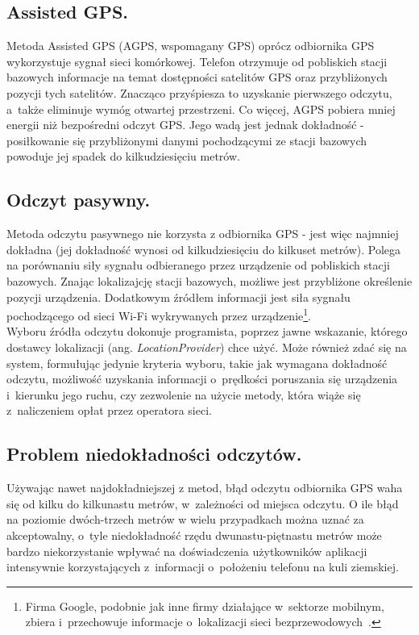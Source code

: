 \documentclass[a4paper,twocolumn,11pt]{article}
\begin{document}
\subsection{Assisted GPS.}
 Metoda Assisted GPS (AGPS, wspomagany GPS) oprócz odbiornika GPS wykorzystuje sygnał sieci komórkowej.
 Telefon otrzymuje od pobliskich stacji bazowych informacje na temat dostępności satelitów GPS oraz przybliżonych pozycji tych satelitów.
 Znacząco przyśpiesza to uzyskanie pierwszego odczytu, a~także eliminuje wymóg otwartej przestrzeni.
 Co więcej, AGPS pobiera mniej energii niż bezpośredni odczyt GPS.
 Jego wadą jest jednak dokładność - posiłkowanie się przybliżonymi danymi pochodzącymi ze stacji bazowych powoduje jej spadek do kilkudziesięciu metrów.


\subsection{Odczyt pasywny.}
 Metoda odczytu pasywnego nie korzysta z odbiornika GPS - jest więc najmniej dokładna (jej dokładność wynosi od kilkudziesięciu do kilkuset metrów).
 Polega na porównaniu siły sygnału odbieranego przez urządzenie od pobliskich stacji bazowych.
 Znając lokalizajcję stacji bazowych, możliwe jest przybliżone określenie pozycji urządzenia.
 Dodatkowym źródłem informacji jest siła sygnału pochodzącego od sieci Wi-Fi wykrywanych przez urządzenie\footnote{Firma Google, podobnie jak inne firmy działające w~sektorze mobilnym, zbiera i~przechowuje informacje o~lokalizacji sieci bezprzewodowych~\cite{wifi:loc}.}.\\

Wyboru źródła odczytu dokonuje programista, poprzez jawne wskazanie, którego dostawcy lokalizacji (ang. \emph{LocationProvider}) chce użyć.
Może również zdać się na system, formułując jedynie kryteria wyboru, takie jak wymagana dokładność odczytu, możliwość uzyskania informacji o~prędkości poruszania się urządzenia i~kierunku jego ruchu, czy zezwolenie na użycie metody, która wiąże się z~naliczeniem opłat przez operatora sieci.


\subsection{Problem niedokładności odczytów.}
 Używając nawet najdokładniejszej z metod, błąd odczytu odbiornika GPS waha się od kilku do kilkunastu metrów, w~zależności od miejsca odczytu.
 O ile błąd na poziomie dwóch-trzech metrów w wielu przypadkach można uznać za akceptowalny, o~tyle niedokładność rzędu dwunastu-piętnastu metrów może bardzo niekorzystanie wpływać na doświadczenia użytkowników aplikacji intensywnie korzystających z~informacji o~położeniu telefonu na kuli ziemskiej.
 
\end{document}

